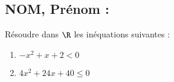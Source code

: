 \documentclass[a4paper,11pt,exos]{nsi} %
\begin{document}


\subsection*{NOM, Prénom : \dotfill} 

\maketitle

\begin{exercice}
    Résoudre dans $\R$ les inéquations suivantes :
    \begin{multicols}{2}
        \begin{enumerate}
            \item $-x^2+x+2< 0$
	        \item $4x^2+24x+40\leqslant 0$
        \end{enumerate}
    \end{multicols}
    
\end{exercice}

\end{document}
